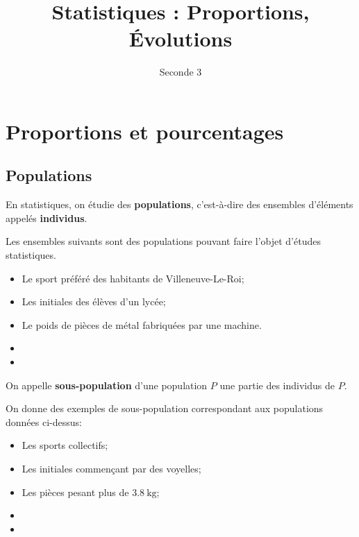 \documentclass{poly}
\title{Statistiques : Proportions, Évolutions}
\date{}
\author{Seconde 3}
\begin{document}
\maketitle

\section{Proportions et pourcentages}
\subsection{Populations}
\begin{definition}
En statistiques, on étudie des \textbf{populations}, c'est-à-dire des ensembles d'éléments appelés \textbf{individus}.  
\end{definition}
\begin{example} 
Les ensembles suivants sont des populations pouvant faire l'objet d'études statistiques. 
\begin{itemize}
\item Le sport préféré des habitants de Villeneuve-Le-Roi;
\item Les initiales des élèves d'un lycée;
\item Le poids de pièces de métal fabriquées par une machine.
\item
\item 
\end{itemize}
\end{example}
\begin{definition}
On appelle \textbf{sous-population} d'une population $P$ une partie des individus de $P$.
\end{definition}
\begin{example}
On donne des exemples de sous-population correspondant aux populations données ci-dessus:
\begin{itemize}
\item Les sports collectifs;
\item Les initiales commençant par des voyelles;
\item Les pièces pesant plus de $\qty{3,8}{\kilo\gram}$;
\item 
\item 
\end{itemize}
\end{example}
\newpage
\end{document}
